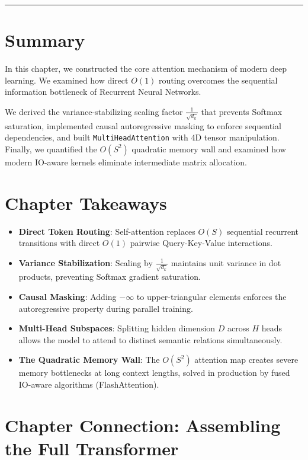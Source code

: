 \documentclass[
  letterpaper,
]{scrbook}
\providecommand{\tightlist}{%
  \setlength{\itemsep}{0pt}\setlength{\parskip}{0pt}}
\begin{document}
\begin{center}\rule{0.5\linewidth}{0.5pt}\end{center}

\section{Summary}\label{summary-12}

In this chapter, we constructed the core attention mechanism of modern
deep learning. We examined how direct \(O(1)\) routing overcomes the
sequential information bottleneck of Recurrent Neural Networks.

We derived the variance-stabilizing scaling factor
\(\frac{1}{\sqrt{d_k}}\) that prevents Softmax saturation, implemented
causal autoregressive masking to enforce sequential dependencies, and
built \texttt{MultiHeadAttention} with 4D tensor manipulation. Finally,
we quantified the \(O(S^2)\) quadratic memory wall and examined how
modern IO-aware kernels eliminate intermediate matrix allocation.

\section{Chapter Takeaways}\label{chapter-takeaways-12}

\begin{itemize}
\tightlist
\item
  \textbf{Direct Token Routing}: Self-attention replaces \(O(S)\)
  sequential recurrent transitions with direct \(O(1)\) pairwise
  Query-Key-Value interactions.
\item
  \textbf{Variance Stabilization}: Scaling by \(\frac{1}{\sqrt{d_k}}\)
  maintains unit variance in dot products, preventing Softmax gradient
  saturation.
\item
  \textbf{Causal Masking}: Adding \(-\infty\) to upper-triangular
  elements enforces the autoregressive property during parallel
  training.
\item
  \textbf{Multi-Head Subspaces}: Splitting hidden dimension \(D\) across
  \(H\) heads allows the model to attend to distinct semantic relations
  simultaneously.
\item
  \textbf{The Quadratic Memory Wall}: The \(O(S^2)\) attention map
  creates severe memory bottlenecks at long context lengths, solved in
  production by fused IO-aware algorithms (FlashAttention).
\end{itemize}

\section{Chapter Connection: Assembling the Full
Transformer}\label{chapter-connection-assembling-the-full-transformer}
\end{document}
